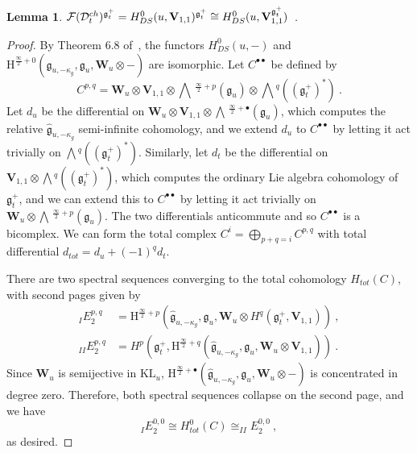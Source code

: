 \documentclass[a4paper]{article}
\newtheorem{lem}[thm]{Lemma}
\def\FF{{\cal F}}
\def\gf{\mathfrak{g}}
\def \KL{\mathrm{KL}}
\newcommand{\Hi}[1]{\mathrm{H}^{\frac{\infty}{2}+#1}}
\newcommand{\Li}[1]{\mathrm{\bigwedge}\,^{\frac{\infty}{2}+#1}}
\def\D{\mathcal{D}^{ch}}
\def\W{\mathbf{W}}
\def\V{\mathbf{V}}
\begin{document}
\begin{lem}
$\FF(\D_t)^{\gf_t^+}= H^0_{DS}(u,\V_{1,1})^{\gf_t^+} \cong H^0_{DS}(u,\V_{1,1}^{\gf_t^+})$~.
\end{lem}
\begin{proof}
By Theorem $6.8$ of~\cite{Arakawa:2018egx}, the functors $H^0_{DS}(u,-)$ and $\Hi{0}(\hat{\gf}_{u,-\kappa_g}, \gf_u,\W_u\otimes -)$ are isomorphic. Let $C^{\bullet\bullet}$ be defined by
\begin{equation*}
	C^{p,q} = \W_u \otimes \V_{1,1} \otimes \Li{p}(\gf_u) \otimes \bigwedge\! ^q((\gf_t^+)^*)~.
\end{equation*}
Let $d_u$ be the differential on $\W_u\otimes \V_{1,1}\otimes \Li{\bullet}(\gf_u)$, which computes the relative $\hat{\gf}_{u,-\kappa_g}$ semi-infinite cohomology, and we extend $d_u$ to $C^{\bullet\bullet}$ by letting it act trivially on $\bigwedge\! ^q((\gf_t^+)^*)$. Similarly, let $d_t$ be the differential on $\V_{1,1}\otimes \bigwedge\! ^q((\gf_t^+)^*)$, which computes the ordinary Lie algebra cohomology of $\gf_t^+$, and we can extend this to $C^{\bullet\bullet}$ by letting it act trivially on $\W_u\otimes\Li{p}(\gf_u)$. The two differentials anticommute and so $C^{\bullet\bullet}$ is a bicomplex. We can form the total complex $C^{i}= \bigoplus_{p+q=i}C^{p,q}$ with total differential $d_{tot} = d_u + (-1)^q d_t$.

There are two spectral sequences converging to the total cohomology $H_{tot}(C)$, with second pages given by
\begin{equation}\nonumber
	\begin{split}
	_I E_2^{p,q} &= \Hi{p}(\hat{\gf}_{u,-\kappa_g},\gf_u, \W_u\otimes H^q(\gf_t^+,\V_{1,1}))~,\\
	_{II} E_2^{p,q} &= H^p(\gf_t^+, \Hi{q}(\hat{\gf}_{u,-\kappa_g},\gf_u, \W_u\otimes \V_{1,1}))~.
	\end{split}
\end{equation}
Since $\W_u$ is semijective in $\KL_u$, $\Hi{\bullet}(\hat{\gf}_{u,-\kappa_g},\gf_u, \W_u\otimes - )$ is concentrated in degree zero. Therefore, both spectral sequences collapse on the second page, and we have
\begin{equation*}
	_I E_2^{0,0} \cong H^0_{tot}(C) \cong _{II} E_2^{0,0}~,
\end{equation*}
as desired.
\end{proof}
\vspace{-6pt}
\end{document}
